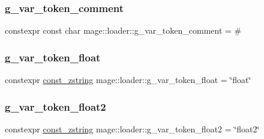 \hypertarget{namespacemage_1_1loader_a51fd34b486dfe1d203f7c7b897b2fd2c}{}\label{namespacemage_1_1loader_a51fd34b486dfe1d203f7c7b897b2fd2c} 
\subsubsection{\texorpdfstring{g\+\_\+var\+\_\+token\+\_\+comment}{g\_var\_token\_comment}}
{\footnotesize\ttfamily constexpr const char mage\+::loader\+::g\+\_\+var\+\_\+token\+\_\+comment = \textquotesingle{}\#\textquotesingle{}}

\hypertarget{namespacemage_1_1loader_aa53b6d14e0550f8bc69f9383658abe4a}{}\label{namespacemage_1_1loader_aa53b6d14e0550f8bc69f9383658abe4a} 
\subsubsection{\texorpdfstring{g\+\_\+var\+\_\+token\+\_\+float}{g\_var\_token\_float}}
{\footnotesize\ttfamily constexpr \hyperlink{namespacemage_abfd9206dc607ceb5d13ec68bf075a5c0}{const\+\_\+zstring} mage\+::loader\+::g\+\_\+var\+\_\+token\+\_\+float = \char`\"{}float\char`\"{}}

\hypertarget{namespacemage_1_1loader_aa28f34682195162b5274c767b2221b41}{}\label{namespacemage_1_1loader_aa28f34682195162b5274c767b2221b41} 
\subsubsection{\texorpdfstring{g\+\_\+var\+\_\+token\+\_\+float2}{g\_var\_token\_float2}}
{\footnotesize\ttfamily constexpr \hyperlink{namespacemage_abfd9206dc607ceb5d13ec68bf075a5c0}{const\+\_\+zstring} mage\+::loader\+::g\+\_\+var\+\_\+token\+\_\+float2 = \char`\"{}float2\char`\"{}}

\hypertarget{namespacemage_1_1loader_a791abcdb5a1a298a02b2a1ea0d7d44c9}{}\label{namespacemage_1_1loader_a791abcdb5a1a298a02b2a1ea0d7d44c9} 
